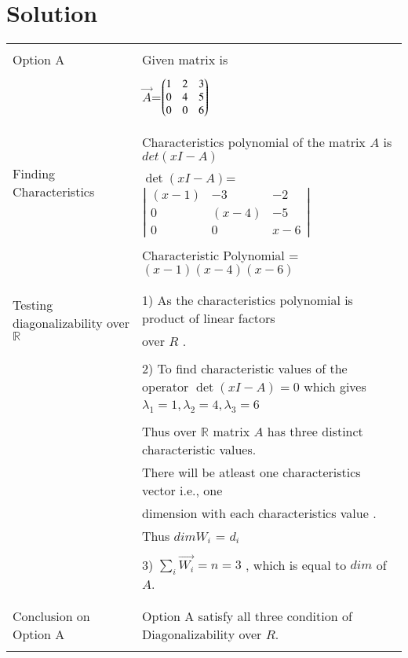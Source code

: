 \documentclass[journal,12pt]{IEEEtran}
\begin{document}
\section{\textbf{Solution}}
\renewcommand{\thetable}{2}
\begin{longtable}{|l|l|}
\hline
\multirow{3}{*}{Option A} & \\
& Given matrix is  \\
&\\
& $\vec{A}$=$\begin{pmatrix}1&2&3\\0&4&5\\0&0&6\end{pmatrix}$\\
&\\
\hline
\multirow{3}{*}{Finding Characteristics} & \\
&
Characteristics polynomial of the matrix $A$ is $det(xI-A)$\\ 
polynomial
& $\det(xI-A)$= $\left|
                \begin{array}{ccc}
                (x-1) & -3 & -2\\
                0 & (x-4) & -5\\
                0 & 0 & x-6
                \end{array} \right|$  \\
&\\
& Characteristic Polynomial = $(x-1)(x-4)(x-6)$\\
&\\
\hline
\multirow{3}{*}{Testing diagonalizability over $\mathbb{R}$} & \\
& 1) As the characteristics  polynomial is product of linear factors\\
&over $R$ .\\
&\\
&2) To find characteristic values of the operator $\det(xI-A) = 0$ which gives  \\
& $\lambda_1= 1 , \lambda_2= 4, \lambda_3= 6$\\
&\\
& Thus over $\mathbb{R}$ matrix $A$ has three distinct characteristic values.\\
&There will be atleast one characteristics vector i.e., one\\ & dimension with each characteristics value .\\
&Thus $dim W_i$ = $d_i$\\
&\\
&3) $\sum_{i} \vec{W_i} = n = 3$ , which is equal to $dim$ of $A$.\\ 
&\\
\hline
\multirow{3}{*}{Conclusion on Option A} & \\
& Option A satisfy all three condition of Diagonalizability over $R$. \\
&\\


\end{longtable}
\end{document}
